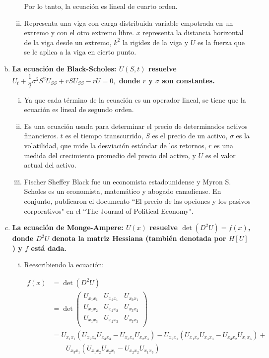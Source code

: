 \documentclass[fleqn]{article}
\begin{document}
\begin{enumerate}[(a)]
\begin{enumerate}[(i)]
			Por lo tanto, la ecuación es lineal de cuarto orden.
			
			\item Representa una viga con carga distribuida variable empotrada en un extremo y con el otro extremo libre. $ x $ representa la distancia horizontal de la viga desde un extremo, $ k^2 $ la rigidez de la viga y $ U $ es la fuerza que se le aplica a la viga en cierto punto.
		\end{enumerate}

		\item \textbf{La ecuación de Black-Scholes: $ U(S,t) $ resuelve $ U_t + \dfrac{1}{2} \sigma^2 S^2 U_{SS} + rS U_{SS} - rU = 0, $ donde $ r $ y $ \sigma $ son constantes.}
		
		\begin{enumerate}[(i)]
			\item Ya que cada término de la ecuación es un operador lineal, se tiene que la ecuación es lineal de segundo orden.
			
			\item Es una ecuación usada para determinar el precio de determinados activos financieros. $ t $ es el tiempo transcurrido, $ S $ es el precio de un activo, $ \sigma $ es la volatilidad, que mide la desviación estándar de los retornos, $ r $ es una medida del crecimiento promedio del precio del activo, y $ U $ es el valor actual del activo.
			
			\item Fischer Sheffey Black fue un economista estadounidense y Myron S. Scholes es un economista, matemático y abogado canadiense.  En conjunto, publicaron el documento ``El precio de las opciones y los pasivos corporativos" en el ``The Journal of Political Economy".
		\end{enumerate}

		\item \textbf{La ecuación de Monge-Ampere: $ U(x) $ resuelve $ \det(D^2 U) = f(x) $, donde $ D^2 U $ denota la matriz Hessiana (también denotada por $ H[U] $) y $ f $ está dada.}
		
		\begin{enumerate}[(i)]
			\item Reescribiendo la ecuación: 
			
			\begin{align*}
				f(x) &= \det(D^2 U) \\
				&= \det \begin{pmatrix}
					U_{x_1 x_1} & U_{x_2 x_1} & U_{x_3 x_1} \\
					U_{x_1 x_2} & U_{x_2 x_2} & U_{x_3 x_2} \\
					U_{x_1 x_3} & U_{x_2 x_3} & U_{x_3 x_3} \\
				\end{pmatrix} \\
				&= U_{x_1 x_1} \left( U_{x_2 x_2} U_{x_3 x_3} - U_{x_3 x_2} U_{x_2 x_3} \right) - U_{x_2 x_1} \left( U_{x_1 x_2} U_{x_3 x_3} - U_{x_3 x_2} U_{x_1 x_3} \right) + \\
				& \qquad U_{x_3 x_1} \left( U_{x_1 x_2} U_{x_2 x_3} - U_{x_2 x_2} U_{x_1 x_3} \right)
			\end{align*}


\end{enumerate}
\end{enumerate}
\end{document}
